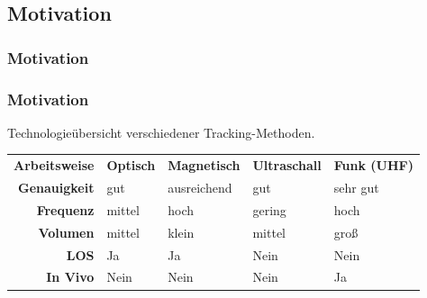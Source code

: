 \subsection{Motivation}
\begin{frame} %
  	\frametitle{Motivation}
  	
\end{frame}
\begin{frame} %
  	\frametitle{Motivation}
  	\begin{center}
  	\small Technologieübersicht verschiedener Tracking-Methoden.
  	\end{center}
%
	\begin{table} [H]
		\begin{center}
			\begin{tabular}{rllll}
				\textbf{Arbeitsweise} & \textbf{Optisch} & \textbf{Magnetisch} & \textbf{Ultraschall} & \textbf{ Funk (UHF)} \\
				\textbf{Genauigkeit} & gut & ausreichend & gut & sehr gut \\
				\textbf{Frequenz} & mittel & hoch & gering & hoch \\
				\textbf{Volumen} & mittel & klein & mittel & groß \\
				\textbf{LOS} & Ja & Ja & Nein & Nein \\
				\textbf{In Vivo} & Nein   & Nein & Nein & Ja \\
%			
			\end{tabular}
		\end{center}
		\label{tab:overview_tracking}
	\end{table}  	
\end{frame}
